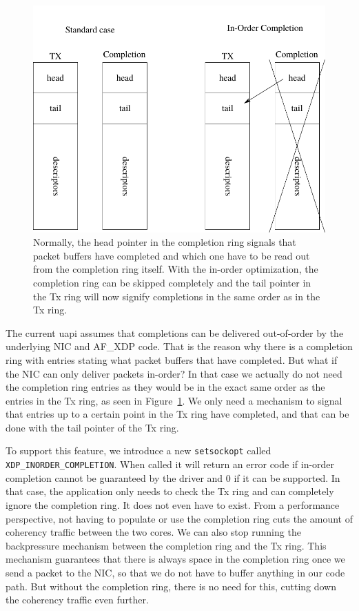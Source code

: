 \documentclass[9pt,numbers,reprint]{sigplanconf}
\begin{document}
\begin{figure}[t]
\includegraphics[width=.5\textwidth]{in_order.pdf}
\caption{Normally, the head pointer in the completion ring signals
  that packet buffers have completed and which one have to be read out
from the completion ring itself. With the in-order optimization, the
completion ring can be skipped completely and the tail pointer in the
Tx ring will now signify completions in the same order as in the Tx ring.}
\label{fig:in_order}
\end{figure}

The current uapi assumes that completions can be delivered
out-of-order by the underlying NIC and AF\_XDP code. That is the reason
why there is a completion ring with entries stating what packet
buffers that have completed. But what if the NIC can only deliver
packets in-order? In that case we actually do not need the completion
ring entries as they would be in the exact same order as the entries
in the Tx ring, as seen in Figure~\ref{fig:in_order}. We only need a
mechanism to signal that entries up to a certain point in the Tx ring
have completed, and that can be done with the tail pointer of the Tx
ring.

To support this feature, we introduce a new {\tt setsockopt} called
{\tt XDP\_INORDER\_COMPLETION}. When called it will return an error
code if in-order completion cannot be guaranteed by the driver and 0
if it can be supported. In that case, the application only needs to
check the Tx ring and can completely ignore the completion ring. It
does not even have to exist. From a performance perspective, not
having to populate or use the completion ring cuts the amount of
coherency traffic between the two cores. We can also stop running the
backpressure mechanism between the completion ring and the Tx
ring. This mechanism guarantees that there is always space in the
completion ring once we send a packet to the NIC, so that we do not
have to buffer anything in our code path. But without the completion
ring, there is no need for this, cutting down the coherency traffic
even further.
\end{document}
